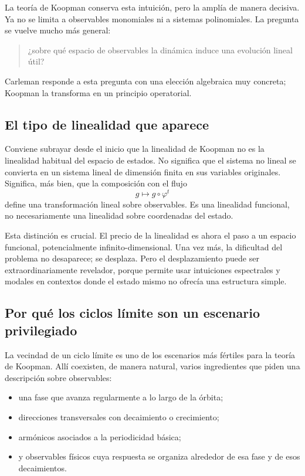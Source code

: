La teoría de Koopman conserva esta intuición, pero la amplía de manera decisiva. Ya no se limita a observables monomiales ni a sistemas polinomiales. La pregunta se vuelve mucho más general:
\begin{quote}
¿sobre qué espacio de observables la dinámica induce una evolución lineal útil?
\end{quote}
Carleman responde a esta pregunta con una elección algebraica muy concreta; Koopman la transforma en un principio operatorial.

\subsection{El tipo de linealidad que aparece}

Conviene subrayar desde el inicio que la linealidad de Koopman no es la linealidad habitual del espacio de estados. No significa que el sistema no lineal se convierta en un sistema lineal de dimensión finita en sus variables originales. Significa, más bien, que la composición con el flujo
\[
g\mapsto g\circ \varphi^t
\]
define una transformación lineal sobre observables. Es una linealidad funcional, no necesariamente una linealidad sobre coordenadas del estado.

Esta distinción es crucial. El precio de la linealidad es ahora el paso a un espacio funcional, potencialmente infinito-dimensional. Una vez más, la dificultad del problema no desaparece; se desplaza. Pero el desplazamiento puede ser extraordinariamente revelador, porque permite usar intuiciones espectrales y modales en contextos donde el estado mismo no ofrecía una estructura simple.



\subsection{Por qué los ciclos límite son un escenario privilegiado}

La vecindad de un ciclo límite es uno de los escenarios más fértiles para la teoría de Koopman. Allí coexisten, de manera natural, varios ingredientes que piden una descripción sobre observables:
\begin{itemize}
\item una fase que avanza regularmente a lo largo de la órbita;
\item direcciones transversales con decaimiento o crecimiento;
\item armónicos asociados a la periodicidad básica;
\item y observables físicos cuya respuesta se organiza alrededor de esa fase y de esos decaimientos.
\end{itemize}

